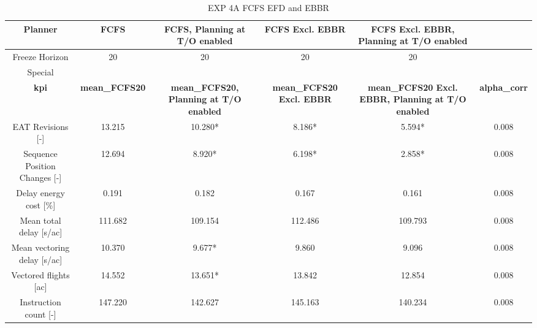 \begin{table}[htbp]
\caption{EXP 4A FCFS EFD and EBBR}
\begin{center}
\footnotesize
\setlength{\tabcolsep}{3pt}
\renewcommand{\arraystretch}{1.000}
\begin{tabular}{|c|c|c|c|c|c|}
\hline
Planner & FCFS & FCFS, Planning at T/O enabled & FCFS Excl. EBBR & FCFS Excl. EBBR, Planning at T/O enabled &  \\
\hline
Freeze Horizon & 20 & 20 & 20 & 20 &  \\
\hline
Special &  &  &  &  &  \\
\hline
\textbf{kpi} & \textbf{mean\_FCFS20} & \textbf{mean\_FCFS20, Planning at T/O enabled} & \textbf{mean\_FCFS20 Excl. EBBR} & \textbf{mean\_FCFS20 Excl. EBBR, Planning at T/O enabled} & \textbf{alpha\_corr} \\
\hline
EAT Revisions [-] & 13.215 & 10.280* & 8.186* & 5.594* & 0.008 \\
\hline
Sequence Position Changes [-] & 12.694 & 8.920* & 6.198* & 2.858* & 0.008 \\
\hline
Delay energy cost [\%] & 0.191 & 0.182 & 0.167 & 0.161 & 0.008 \\
\hline
Mean total delay [s/ac] & 111.682 & 109.154 & 112.486 & 109.793 & 0.008 \\
\hline
Mean vectoring delay [s/ac] & 10.370 & 9.677* & 9.860 & 9.096 & 0.008 \\
\hline
Vectored flights [ac] & 14.552 & 13.651* & 13.842 & 12.854 & 0.008 \\
\hline
Instruction count [-] & 147.220 & 142.627 & 145.163 & 140.234 & 0.008 \\
\hline
\end{tabular}
\label{tab:exp\_4a\_fcfs\_efd\_and\_ebbr}
\end{center}
\end{table}